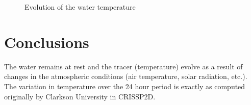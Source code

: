 \begin{figure}[H]
    \begin{center}
    \end{center}
    \caption{Evolution of the water temperature}
    \label{fig:thermal_temp}
\end{figure}

\section{Conclusions}

The water remains at rest and the tracer (temperature) evolve as a result of changes in the atmospheric conditions (air temperature, solar radiation, etc.).
The variation in temperature over the 24 hour period is exactly as computed originally by Clarkson University in CRISSP2D.


\renewcommand{\labelitemi}{\textbullet}
